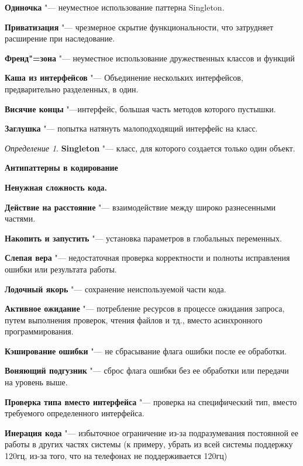 \documentclass[bachelor, och, pract]{SCWorks}
\theoremstyle{remark}
\newtheorem{definition}{Определение}
\begin{document}
    \textbf{Одиночка} "--- неуместное использование паттерна Singleton.
    
    \textbf{Приватизация} "--- чрезмерное скрытие функциональности, что затрудняет расширение при наследование.
    
    \textbf{Френд"=зона} "--- неуместное использование дружественных классов и функций
    
    \textbf{Каша из интерфейсов} "--- Объединение нескольких интерфейсов, предварительно разделенных, в один.
    
    \textbf{Висячие концы} "---интерфейс, большая часть методов которого пустышки.
    
    \textbf{Заглушка} "--- попытка натянуть малоподходящий интерфейс на класс.

    \begin{definition}
        \textbf{Singleton} "--- класс, для которого создается только один объект.
    \end{definition}



    \begin{center}
        \textbf{Антипаттерны в кодирование}
    \end{center}

    \textbf{Ненужная сложность кода.}
    
    \textbf{Действие на расстояние} "--- взаимодействие между широко разнесенными частями.
    
    \textbf{Накопить и запустить} "--- установка параметров в глобальных переменных.
    
    \textbf{Слепая вера} "--- недостаточная проверка корректности и полноты исправления ошибки или результата работы.
    
    \textbf{Лодочный якорь} "--- сохранение неиспользуемой части кода.
    
    \textbf{Активное ожидание} "--- потребление ресурсов в процессе ожидания запроса, путем выполнения проверок, чтения файлов и тд., вместо асинхронного программирования.
    
    \textbf{Кэширование ошибки} "--- не сбрасывание флага ошибки после ее обработки.
    
    \textbf{Воняющий подгузник} "--- сброс флага ошибки без ее обработки или передачи на уровень выше.
    
    \textbf{Проверка типа вместо интерфейса} "--- проверка на специфический тип, вместо требуемого определенного интерфейса.
    
    \textbf{Инерация кода } "--- избыточное ограничение из-за подразумевания постоянной ее работы в других частях системы (к примеру, убрать из всей системы поддержку 120гц, из-за того, что на телефонах не поддерживается 120гц)
    
\end{document}
